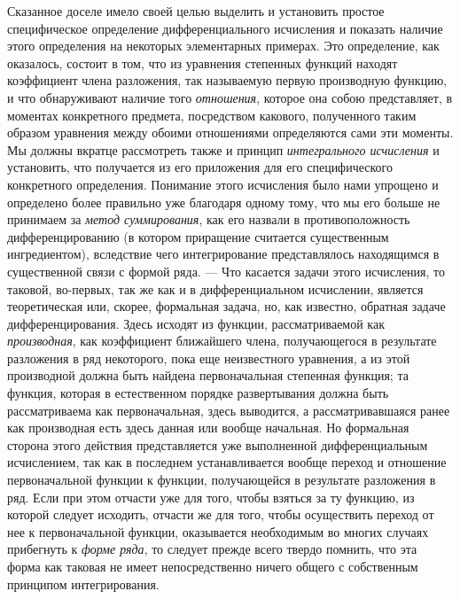 Сказанное доселе имело своей целью выделить и установить простое
специфическое определение дифференциального исчисления и показать наличие
этого определения на некоторых элементарных примерах. Это определение, как
оказалось, состоит в том, что из уравнения степенных функций находят
коэффициент члена разложения, так называемую первую производную функцию, и
что обнаруживают наличие того {\em отношения}, которое
она собою представляет, в моментах конкретного предмета, посредством
какового, полученного таким образом уравнения между обоими отношениями
определяются сами эти моменты. Мы должны вкратце рассмотреть также и
принцип {\em интегрального исчисления} и установить,
что получается из его приложения для его специфического конкретного
определения. Понимание этого исчисления было нами упрощено и определено
более правильно уже благодаря одному тому, что мы его больше не принимаем
за {\em метод суммирования}, как его назвали в
противоположность дифференцированию (в котором приращение считается
существенным ингредиентом), вследствие чего интегрирование представлялось
находящимся в существенной связи с формой ряда. — Что касается задачи этого
исчисления, то таковой, во-первых, так же как и в дифференциальном
исчислении, является теоретическая или, скорее, формальная задача, но, как
известно, обратная задаче дифференцирования. Здесь исходят из функции,
рассматриваемой как {\em производная}, как коэффициент
ближайшего члена, получающегося в результате разложения в ряд некоторого,
пока еще неизвестного уравнения, а из этой производной должна быть найдена
первоначальная степенная функция; та функция, которая в естественном
\label{bkm:bm53b}порядке развертывания должна быть рассматриваема как первоначальная, здесь
выводится, а рассматривавшаяся ранее как производная есть здесь данная или
вообще начальная. Но формальная сторона этого действия представляется уже
выполненной дифференциальным исчислением, так как в последнем
устанавливается вообще переход и отношение первоначальной функции к
функции, получающейся в результате разложения в ряд. Если при этом отчасти
уже для того, чтобы взяться за ту функцию, из которой следует исходить,
отчасти же для того, чтобы осуществить переход от нее к первоначальной
функции, оказывается необходимым во многих случаях прибегнуть к
{\em форме ряда}, то следует прежде всего твердо
помнить, что эта форма как таковая не имеет непосредственно ничего общего с
собственным принципом интегрирования.

